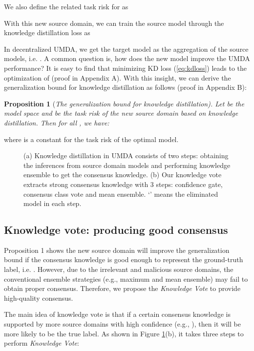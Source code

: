 \documentclass{article}
\begin{document}
We also define the related task risk for  as 

With this new source domain, we can train the source model  through the knowledge distillation loss as

In decentralized UMDA, we get the target model as the aggregation of the source models, i.e. . A common question is, how does the new model  improve the UMDA performance? It is easy to find that minimizing KD loss (\ref{eq:kdloss}) leads to the optimization of  (proof in Appendix A). With this insight, we can derive the generalization bound for knowledge distillation as follows (proof in Appendix B):

\textbf{Proposition 1} (\textit{The generalization bound for knowledge distillation). Let  be the model space and  be the task risk of the new source domain  based on knowledge distillation. Then for all , we have:}

where  is a constant for the task risk of the optimal model.
\begin{figure}[t]
\centering
{}
\quad    
{}
\caption{(a) Knowledge distillation in UMDA consists of two steps: obtaining the inferences from source domain models and performing knowledge ensemble to get the consensus knowledge. (b) Our knowledge vote extracts strong consensus knowledge with 3 steps: confidence gate, consensus class vote and mean ensemble. `\textcolor{red}{}' means the eliminated model in each step.}
\label{fig:kdkv}
\vspace{-0.2cm}
\end{figure}

\subsection{Knowledge vote: producing good consensus}
Proposition 1 shows the new source domain  will improve the generalization bound if the consensus knowledge is good enough to represent the ground-truth label, i.e. . However, due to the irrelevant and malicious source domains, the conventional ensemble strategies (e.g., maximum and mean ensemble) may fail to obtain proper consensus. Therefore, we propose the \textit{Knowledge Vote} to provide high-quality consensus. 

The main idea of knowledge vote is that if a certain consensus knowledge is supported by more source domains with high confidence (e.g., ), then it will be more likely to be the true label. As shown in Figure \ref{fig:kdkv}(b), it takes three steps to perform \textit{Knowledge Vote}:
\end{document}
